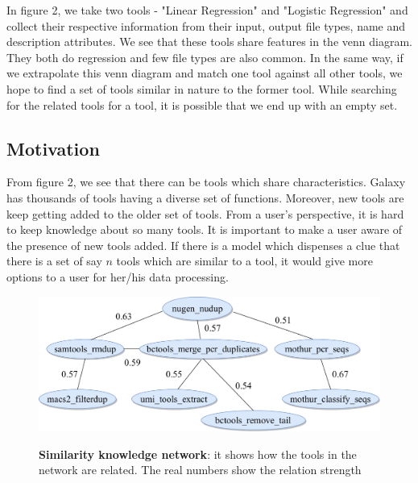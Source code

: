 In figure 2, we take two tools - "Linear Regression" and "Logistic Regression" and collect their respective information from their input, output file types, name and description attributes. We see that these tools share features in the venn diagram. They both do regression and few file types are also common. In the same way, if we extrapolate this venn diagram and match one tool against all other tools, we hope to find a set of tools similar in nature to the former tool. While searching for the related tools for a tool, it is possible that we end up with an empty set.

\subsection{Motivation}
From figure 2, we see that there can be tools which share characteristics. Galaxy has thousands of tools having a diverse set of functions. Moreover, new tools are keep getting added to the older set of tools. From a user's perspective, it is hard to keep knowledge about so many tools. It is important to make a user aware of the presence of new tools added. If there is a model which dispenses a clue that there is a set of say $n$ tools which are similar to a tool, it would give more options to a user for her/his data processing. 

\begin{figure}[h]
\begin{centering}
    {\includegraphics[scale=0.5]{figures/tools_sim_know_graph.pdf}}
    \caption[Similarity knowledge network]{\textbf{Similarity knowledge network}: it shows how the tools in the network are related. The real numbers show the relation strength}
\end{centering}
\end{figure}

